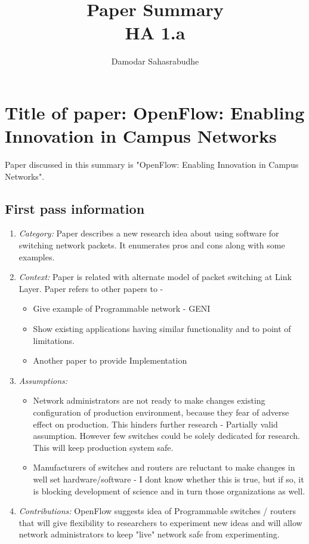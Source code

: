 \documentclass[letterpaper,twocolumn,10pt]{article}
\title{Paper Summary\\
HA 1.a\\}
\author{Damodar Sahasrabudhe}
\affil{School of Computing, University of Utah}
\begin{document}
\maketitle
\section{Title of paper: OpenFlow: Enabling Innovation in Campus Networks}
Paper discussed in this summary is "OpenFlow: Enabling Innovation in Campus Networks"\cite{openflow}.

\subsection{First pass information}
\label{sec:first}

\begin{enumerate}

\item {\it Category:} Paper describes a new research idea about using software for switching network packets. It enumerates pros and cons along with some examples.

\item {\it Context:} Paper is related with alternate model of packet switching at Link Layer. Paper refers to other papers to -
\begin{itemize}
\item Give example of Programmable network - GENI 
\item Show existing applications having similar functionality and to point of limitations.
\item Another paper to provide Implementation
\end{itemize}

\item {\it Assumptions:}  
\begin{itemize}
\item Network administrators are not ready to make changes existing configuration of production environment, because they fear of adverse effect on production. This hinders further research - Partially valid assumption. However few switches could be solely dedicated for research. This will keep production system safe.
\item Manufacturers of switches and routers are reluctant to make changes in well set hardware/software - I dont know whether this is true, but if so, it is blocking development of science and in turn those organizations as well.
\end{itemize}
\item {\it Contributions:} OpenFlow suggests idea of Programmable switches / routers that will give flexibility to researchers to experiment new ideas and will allow network administrators to keep "live" network safe from experimenting.


\end{enumerate}
\end{document}
